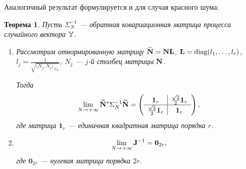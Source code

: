 \documentclass[12pt,a4paper]{article}
\def\diag{\mathop{\mathrm{diag}}}
\newtheorem{theorem}{Теорема}
\begin{document}
Аналогичный результат формулируется и для случая красного шума:
\begin{theorem}\label{th:freqrnconsistency}
	Пусть $\Sigma_N^{-1}$ --- обратная ковариационная матрица процесса случайного вектора $\mathbb{Y}$.
	
	\begin{enumerate}
		\item Рассмотрим отнормированную матрицу $\widetilde {\mathbf{N}} = \mathbf{N} \mathbf{L}$, $\bfL = \diag(l_1, \ldots, l_r)$, 
		$l_j =\frac{1}{\sqrt{\langle N_j, N_j \rangle_{\Sigma_N}}}$, $N_j$ --- $j$-й столбец матрицы $\mathbf{N}$.
		
		Тогда \begin{equation*}
		\lim_{N \to + \infty} \widetilde {\mathbf{N}}^* \Sigma_N^{-1} \widetilde {\mathbf{N}} = \left( \begin{array}{c|c}
		\mathbf{1}_r & \frac{\sqrt{3}}{2} \mathbf{1}_r  \\ \hline
		\frac{\sqrt{3}}{2} \mathbf{1}_r & \mathbf{1}_r
		\end{array}  \right),
		\end{equation*}
		где матрица $\mathbf{1}_{r}$ --- единичная квадратная матрица порядка $r$.
		
		\item 
		\begin{equation*}
		\lim_{N \to + \infty} \mathbf{J}^{-1} = \mathbf{0}_{2r},
		\end{equation*}
		где $\mathbf{0}_{2r}$ --- нулевая матрица порядка $2r$.
	\end{enumerate}
\end{theorem}
\end{document}
